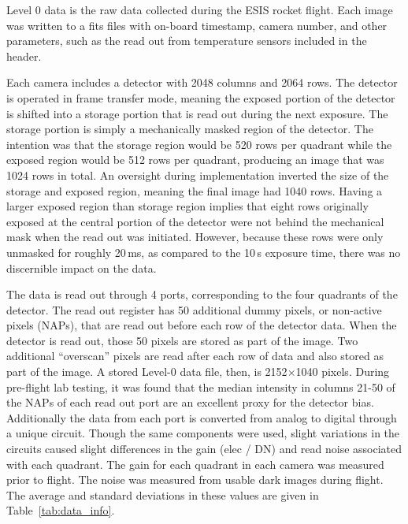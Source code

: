 Level 0 data is the raw data collected during the ESIS rocket flight.  
Each image was written to a fits files with on-board timestamp, camera number, and other parameters, such as the read out from temperature sensors included in the header.   

Each camera includes a detector with 2048 columns and 2064 rows.  The detector is operated in frame transfer mode, meaning the exposed portion of the detector is shifted into a storage portion that is read out during the next exposure. The storage portion is simply a mechanically masked region of the detector. The intention was that the storage region would be 520 rows per quadrant while the exposed region would be 512 rows per quadrant, producing an image that was 1024 rows in total.  An oversight during implementation inverted the size of the storage and exposed region, meaning the final image had 1040 rows.  Having a larger exposed region than storage region implies that eight rows originally exposed at the central portion of the detector were not behind the mechanical mask when the read out was initiated. However, because these rows were only unmasked for roughly 20\,ms, as compared to the 10\,s exposure time, there was no discernible impact on the data. 



The data is read out through 4 ports, corresponding to the four quadrants of the detector.  The read out register has 50 additional dummy pixels, or non-active pixels (NAPs), that are read out before each row of the detector data.  When the detector is read out, those 50 pixels are stored as part of the image.  Two additional ``overscan'' pixels are read after each row of data and also stored as part of the image.  A stored Level-0 data file, then, is 2152$\times$1040 pixels.   During pre-flight lab testing, it was found that the median intensity in columns 21-50 of the NAPs of each read out port are an excellent proxy for the detector bias.  Additionally the data from each port is converted from analog to digital through a unique circuit.  Though the same components were used, slight variations in the circuits caused slight differences in the gain (elec / DN) and read  noise associated with each quadrant.  The gain for each quadrant in each camera was measured prior to flight.  The noise was measured from usable dark images during flight.  The average and standard deviations in these values are given in Table~\ref{tab:data_info}.
    
